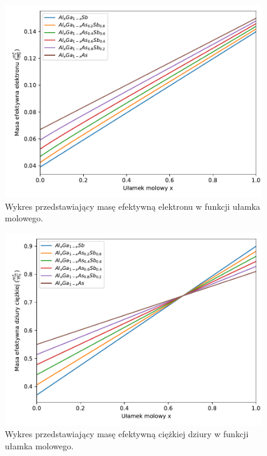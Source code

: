 \documentclass[12pt,openany,a4paper]{book}
\begin{document}
\begin{figure}[H]
	\centering
	\includegraphics[width = 0.9\linewidth]{Figures/quaternary/quat_m_e_y.pdf}
	\caption{Wykres przedstawiający masę efektywną elektronu w funkcji ułamka 
	molowego.}\label{fig:quat_me_y}
\end{figure}

\begin{figure}[H]
	\centering
	\includegraphics[width = 0.9\linewidth]{Figures/quaternary/quat_m_hh_y.pdf}
	\caption{Wykres przedstawiający masę efektywną ciężkiej dziury w funkcji ułamka 
	molowego.}\label{fig:quat_mhh_y}
\end{figure}
\end{document}
